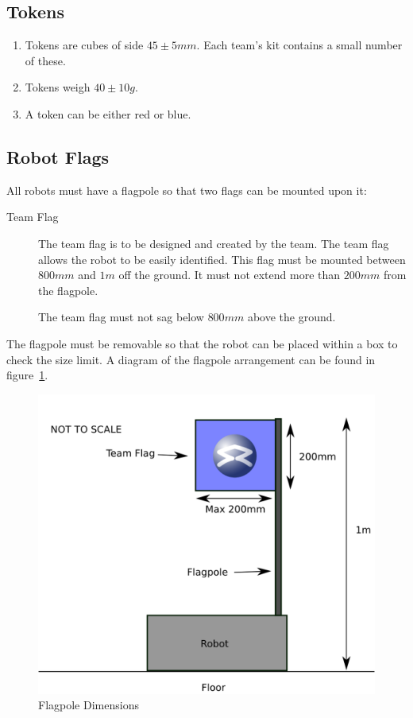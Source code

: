 \subsection{Tokens}
\label{tokens}
\begin {enumerate} 
\item Tokens are cubes of side $45\pm5mm$.
 Each team's kit contains a small number of these.
\item Tokens weigh $40\pm10g$.
\item A token can be either red or blue.
\end {enumerate}

\subsection{Robot Flags}
\label{sec:flags}
All robots must have a flagpole so that two flags can be mounted upon it:
\begin{description}
\item[Team Flag] The team flag is to be designed and created by the team.
 The team flag allows the robot to be easily identified.
 This flag must be mounted between $800mm$ and $1m$ off the ground.
 It must not extend more than $200mm$ from the flagpole.

The team flag must not sag below $800mm$ above the ground.
\end{description}

The flagpole must be removable so that the robot can be placed within a box to check the size limit.
A diagram of the flagpole arrangement can be found in figure~\ref{fig:flag}.

\begin{figure}
\begin{center}
\includegraphics[keepaspectratio, scale =1]{./images/flag.png}
\caption{\label{fig:flag}Flagpole Dimensions}
\end{center}
\end{figure}
\clearpage
